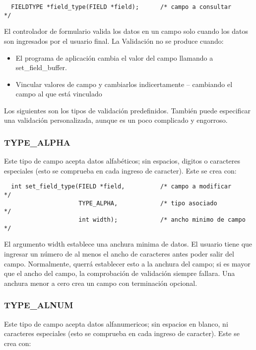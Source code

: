 \documentclass{article}
\begin{document}
\begin{verbatim}
  FIELDTYPE *field_type(FIELD *field);      /* campo a consultar       */
\end{verbatim}

El controlador de formulario valida los datos en un campo solo cuando los datos
son ingresados por el usuario final. La Validación no se produce cuando:

\begin{itemize}
  \item El programa de aplicación cambia el valor del campo llamando a
    set\_field\_buffer.
  \item Vincular valores de campo y cambiarlos indicertamente – cambiando el
    campo al que está vinculado
\end{itemize}

Los siguientes son los tipos de validación predefinidos. También puede
especificar una validación personalizada, aunque es un poco complicado y
engorroso.

\subsubsection*{TYPE\_ALPHA}%
Este tipo de campo acepta datos alfabéticos; sin espacios, digitos o caracteres
especiales (esto se comprueba en cada ingreso de caracter). Este se crea con:

\begin{verbatim}
  int set_field_type(FIELD *field,          /* campo a modificar     */
                     TYPE_ALPHA,            /* tipo asociado         */
                     int width);            /* ancho minimo de campo */
\end{verbatim}

El argumento width establece una anchura minima de datos. El usuario tiene que
ingresar un número de al menos el ancho de caracteres antes poder salir del
campo. Normalmente, querrá establecer esto a la anchura del campo; si es mayor
que el ancho del campo, la comprobación de validación siempre fallara. Una
anchura menor a cero crea un campo con terminación opcional.

\subsubsection*{TYPE\_ALNUM}%
Este tipo de campo acepta datos alfanumericos; sin espacios en blanco, ni
caracteres especiales (esto se comprueba en cada ingreso de caracter). Este se
crea con:
\end{document}
